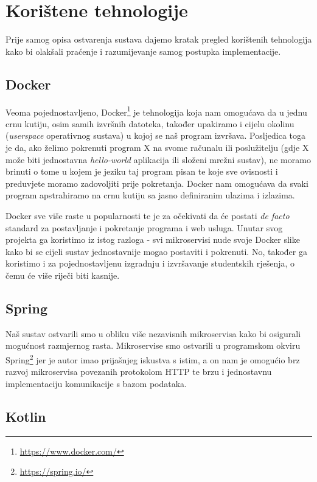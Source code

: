 \documentclass[times, utf8, zavrsni]{fer}
\begin{document}
\section{Korištene tehnologije}

Prije samog opisa ostvarenja sustava dajemo kratak pregled korištenih tehnologija kako bi olakšali praćenje i razumijevanje samog postupka implementacije.

\subsection{Docker}

Veoma pojednostavljeno, Docker{\footnote{\url{https://www.docker.com/}}} je tehnologija koja nam omogućava da u jednu crnu kutiju, osim samih izvršnih datoteka, također upakiramo i cijelu okolinu (\textit{userspace} operativnog sustava) u kojoj se naš program izvršava. Posljedica toga je da, ako želimo pokrenuti program X na svome računalu ili poslužitelju (gdje X može biti jednostavna \textit{hello-world} aplikacija ili složeni mrežni sustav), ne moramo brinuti o tome u kojem je jeziku taj program pisan te koje sve ovisnosti i preduvjete moramo zadovoljiti prije pokretanja. Docker nam omogućava da svaki program apstrahiramo na crnu kutiju sa jasno definiranim ulazima i izlazima.

Docker sve više raste u popularnosti te je za očekivati da će postati \textit{de facto} standard za postavljanje i pokretanje programa i web usluga. Unutar svog projekta ga koristimo iz istog razloga - svi mikroservisi nude svoje Docker slike kako bi se cijeli sustav jednostavnije mogao postaviti i pokrenuti. No, također ga koristimo i za pojednostavljenu izgradnju i izvršavanje studentskih rješenja, o čemu će više riječi biti kasnije.

\subsection{Spring}

Naš sustav ostvarili smo u obliku više nezavisnih mikroservisa kako bi osigurali mogućnost razmjernog rasta. Mikroservise smo ostvarili u programskom okviru Spring{\footnote{\url{https://spring.io/}}} jer je autor imao prijašnjeg iskustva s istim, a on nam je omogućio brz razvoj mikroservisa povezanih protokolom HTTP te brzu i jednostavnu implementaciju komunikacije s bazom podataka.

\subsection{Kotlin}
\end{document}

